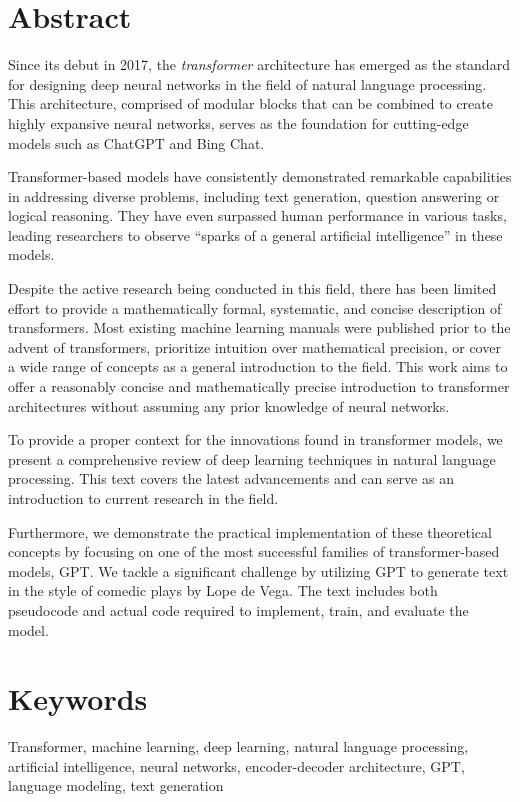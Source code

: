 
\section*{Abstract}
Since its debut in 2017, the \textit{transformer} architecture has emerged as the standard for designing deep neural networks in the field of natural language processing. This architecture, comprised of modular blocks that can be combined to create highly expansive neural networks, serves as the foundation for cutting-edge models such as ChatGPT and Bing Chat.

Transformer-based models have consistently demonstrated remarkable capabilities in addressing diverse problems, including text generation, question answering or logical reasoning. They have even surpassed human performance in various tasks, leading researchers to observe ``sparks of a general artificial intelligence'' in these models.

Despite the active research being conducted in this field, there has been limited effort to provide a mathematically formal, systematic, and concise description of transformers. Most existing machine learning manuals were published prior to the advent of transformers, prioritize intuition over mathematical precision, or cover a wide range of concepts as a general introduction to the field. This work aims to offer a reasonably concise and mathematically precise introduction to transformer architectures without assuming any prior knowledge of neural networks.

To provide a proper context for the innovations found in transformer models, we present a comprehensive review of deep learning techniques in natural language processing. This text covers the latest advancements and can serve as an introduction to current research in the field.

Furthermore, we demonstrate the practical implementation of these theoretical concepts by focusing on one of the most successful families of transformer-based models, GPT. We tackle a significant challenge by utilizing GPT to generate text in the style of comedic plays by Lope de Vega. The text includes both pseudocode and actual code required to implement, train, and evaluate the model.

\section*{Keywords}
Transformer, machine learning, deep learning, natural language processing, artificial intelligence, neural networks, encoder-decoder architecture, GPT, language modeling, text generation  